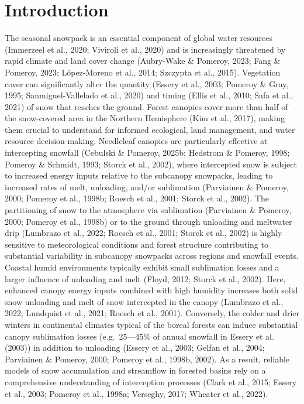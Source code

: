 \documentclass[
]{agujournal2019}
\begin{document}
\section{Introduction}\label{introduction}

The seasonal snowpack is an essential component of global water
resources (Immerzeel et al., 2020; Viviroli et al., 2020) and is
increasingly threatened by rapid climate and land cover change
(Aubry-Wake \& Pomeroy, 2023; Fang \& Pomeroy, 2023; López-Moreno et
al., 2014; Szczypta et al., 2015). Vegetation cover can significantly
alter the quantity (Essery et al., 2003; Pomeroy \& Gray, 1995;
Sanmiguel-Vallelado et al., 2020) and timing (Ellis et al., 2010; Safa
et al., 2021) of snow that reaches the ground. Forest canopies cover
more than half of the snow-covered area in the Northern Hemisphere (Kim
et al., 2017), making them crucial to understand for informed
ecological, land management, and water resource decision-making.
Needleleaf canopies are particularly effective at intercepting snowfall
(Cebulski \& Pomeroy, 2025b; Hedstrom \& Pomeroy, 1998; Pomeroy \&
Schmidt, 1993; Storck et al., 2002), where intercepted snow is subject
to increased energy inputs relative to the subcanopy snowpacks, leading
to increased rates of melt, unloading, and/or sublimation (Parviainen \&
Pomeroy, 2000; Pomeroy et al., 1998b; Roesch et al., 2001; Storck et
al., 2002). The partitioning of snow to the atmosphere via sublimation
(Parviainen \& Pomeroy, 2000; Pomeroy et al., 1998b) or to the ground
through unloading and meltwater drip (Lumbrazo et al., 2022; Roesch et
al., 2001; Storck et al., 2002) is highly sensitive to meteorological
conditions and forest structure contributing to substantial variability
in subcanopy snowpacks across regions and snowfall events. Coastal humid
environments typically exhibit small sublimation losses and a larger
influence of unloading and melt (Floyd, 2012; Storck et al., 2002).
Here, enhanced canopy energy inputs combined with high humidity
increases both solid snow unloading and melt of snow intercepted in the
canopy (Lumbrazo et al., 2022; Lundquist et al., 2021; Roesch et al.,
2001). Conversely, the colder and drier winters in continental climates
typical of the boreal forests can induce substantial canopy sublimation
losses (e.g.~25---45\% of annual snowfall in Essery et al. (2003)) in
addition to unloading (Essery et al., 2003; Gelfan et al., 2004;
Parviainen \& Pomeroy, 2000; Pomeroy et al., 1998b, 2002). As a result,
reliable models of snow accumulation and streamflow in forested basins
rely on a comprehensive understanding of interception processes (Clark
et al., 2015; Essery et al., 2003; Pomeroy et al., 1998a; Verseghy,
2017; Wheater et al., 2022).
\end{document}
